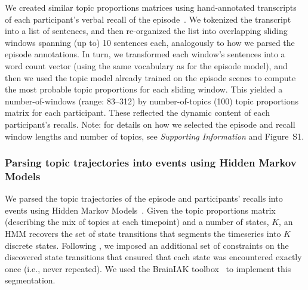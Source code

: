 \documentclass{article}
\newcommand{\topicopt}{S1}
\begin{document}
We created similar topic proportions matrices using hand-annotated transcripts of each participant's verbal recall of the episode~\citep[annotated by][]{ChenEtal17}.  We tokenized the transcript into a list of sentences, and then re-organized the list into overlapping sliding windows spanning (up to) 10 sentences each, analogously to how we parsed the episode annotations.  In turn, we transformed each window's sentences into a word count vector (using the same vocabulary as for the episode model), and then we used the topic model already trained on the episode scenes to compute the most probable topic proportions for each sliding window.  This yielded a number-of-windows (range: 83--312) by number-of-topics (100) topic proportions matrix for each participant.  These reflected the dynamic content of each participant's recalls.  Note: for details on how we selected the episode and recall window lengths and number of topics, see \textit{Supporting Information} and Figure~\topicopt.


\subsubsection*{Parsing topic trajectories into events using Hidden Markov Models}
We parsed the topic trajectories of the episode and participants' recalls into events using Hidden Markov Models~\citep[HMMs;][]{Rabi89}.  Given the topic proportions matrix (describing the mix of topics at each timepoint) and a number of states, $K$, an HMM recovers the set of state transitions that segments the timeseries into $K$ discrete states.  Following \cite{BaldEtal17}, we imposed an additional set of constraints on the discovered state transitions that ensured that each state was encountered exactly once (i.e., never repeated).  We used the BrainIAK toolbox~\citep{Brainiak} to implement this segmentation.
\end{document}

